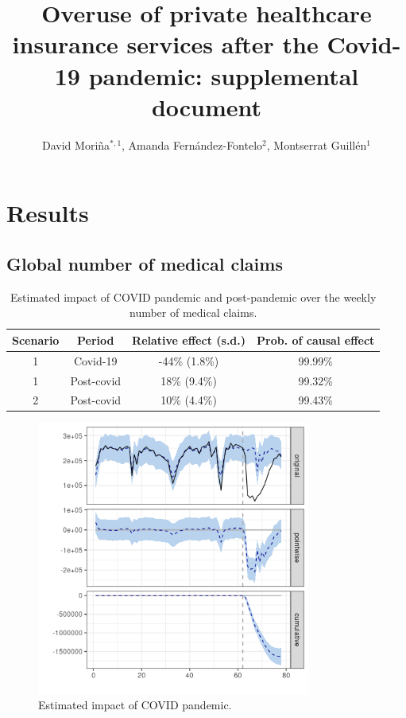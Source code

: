\documentclass[9pt]{osa-supplemental-document}
\title{Overuse of private healthcare insurance services after the Covid-19 pandemic: supplemental document}
\author{David Mori\~na$^{*,1}$, Amanda Fern\'andez-Fontelo$^2$, Montserrat Guill\'en$^1$}
\begin{document}
\maketitle

\section{Results}
\subsection{Global number of medical claims}\label{global}
\begin{table}[H]\caption{Estimated impact of COVID pandemic and post-pandemic over the weekly number of medical claims.}
  \centering  
    \begin{tabular}{ |c|c|c|c| }
        \hline
     \textbf{Scenario} & \textbf{Period} & \textbf{Relative effect (s.d.)} & \textbf{Prob. of causal effect} \\ 
     \hline
     1 & Covid-19 & -44\% (1.8\%) & 99.99\% \\  
     1 & Post-covid & 18\% (9.4\%) & 99.32\% \\
     \hline   
     2 & Post-covid & 10\% (4.4\%) & 99.43\% \\
     \hline
    \end{tabular}
\end{table}

\begin{center}
    \begin{figure}[H]
      \includegraphics[width=9cm]{global_covid.png}\caption{Estimated impact of COVID pandemic.}
    \end{figure}\label{global_covid}
    \end{center}
\end{document}
